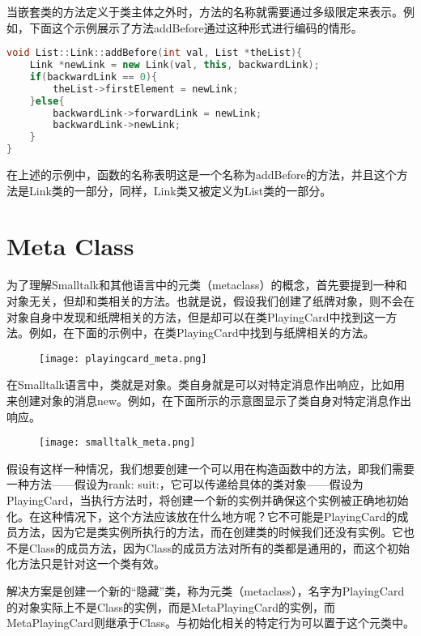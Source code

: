当嵌套类的方法定义于类主体之外时，方法的名称就需要通过多级限定来表示。例如，下面这个示例展示了方法addBefore通过这种形式进行编码的情形。



\begin{lstlisting}[language=C++]
void List::Link::addBefore(int val, List *theList){
	Link *newLink = new Link(val, this, backwardLink);
	if(backwardLink == 0){
		theList->firstElement = newLink;
	}else{
		backwardLink->forwardLink = newLink;
		backwardLink->newLink;
	}
}
\end{lstlisting}

在上述的示例中，函数的名称表明这是一个名称为addBefore的方法，并且这个方法是Link类的一部分，同样，Link类又被定义为List类的一部分。

\section{Meta Class}


为了理解Smalltalk和其他语言中的元类（metaclass）的概念，首先要提到一种和对象无关，但却和类相关的方法。也就是说，假设我们创建了纸牌对象，则不会在对象自身中发现和纸牌相关的方法，但是却可以在类PlayingCard中找到这一方法。例如，在下面的示例中，在类PlayingCard中找到与纸牌相关的方法。

\begin{figure}[htbp]
\centering
\texttt{[image: playingcard\_meta.png]}
\label{fig:playingcard_meta}
\end{figure}


在Smalltalk语言中，类就是对象。类自身就是可以对特定消息作出响应，比如用来创建对象的消息new。例如，在下面所示的示意图显示了类自身对特定消息作出响应。


\begin{figure}[htbp]
\centering
\texttt{[image: smalltalk\_meta.png]}
\label{fig:smalltalk_meta}
\end{figure}

假设有这样一种情况，我们想要创建一个可以用在构造函数中的方法，即我们需要一种方法——假设为rank: suit:，它可以传递给具体的类对象——假设为PlayingCard，当执行方法时，将创建一个新的实例并确保这个实例被正确地初始化。在这种情况下，这个方法应该放在什么地方呢？它不可能是PlayingCard的成员方法，因为它是类实例所执行的方法，而在创建类的时候我们还没有实例。它也不是Class的成员方法，因为Class的成员方法对所有的类都是通用的，而这个初始化方法只是针对这一个类有效。

解决方案是创建一个新的“隐藏”类，称为元类（metaclass），名字为PlayingCard的对象实际上不是Class的实例，而是MetaPlayingCard的实例，而MetaPlayingCard则继承于Class。与初始化相关的特定行为可以置于这个元类中。


